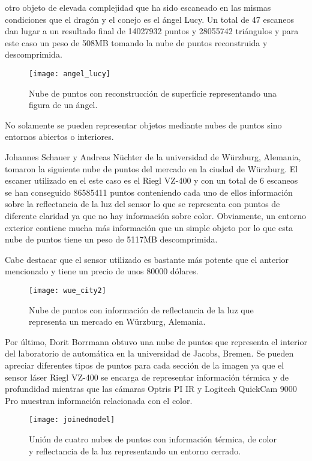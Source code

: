 otro objeto de elevada complejidad que ha sido escaneado en las mismas condiciones que el dragón y el conejo es el ángel Lucy. Un total de 47 escaneos dan lugar a un resultado final de 14027932 puntos y 28055742 triángulos y para este caso un peso de 508MB tomando la nube de puntos reconstruida y descomprimida.

\begin{figure}
\centering
\texttt{[image: angel\_lucy]}
\caption{Nube de puntos con reconstrucción de superficie representando una figura de un ángel.}\label{fig:angel_lucy}
\end{figure}

No solamente se pueden representar objetos mediante nubes de puntos sino entornos abiertos o interiores.

Johannes Schauer y Andreas Nüchter de la universidad de Würzburg, Alemania, tomaron la siguiente nube de puntos del mercado en la ciudad de Würzburg.
El escaner utilizado en el este caso es el Riegl VZ-400 y con un total de 6 escaneos se han conseguido 86585411 puntos conteniendo cada uno de ellos información sobre la reflectancia de la luz del sensor lo que se representa con puntos de diferente claridad ya que no hay información sobre color. Obviamente, un entorno exterior contiene mucha más información que un simple objeto por lo que esta nube de puntos tiene un peso de 5117MB descomprimida.

Cabe destacar que el sensor utilizado es bastante más potente que el anterior mencionado y tiene un precio de unos 80000 dólares.

\begin{figure}
\centering
\texttt{[image: wue\_city2]}
\caption{Nube de puntos con información de reflectancia de la luz que representa un mercado en Würzburg, Alemania.}\label{fig:wue_city}
\end{figure}

Por último, Dorit Borrmann obtuvo una nube de puntos que representa el interior del laboratorio de automática en la universidad de Jacobs, Bremen. Se pueden apreciar diferentes tipos de puntos para cada sección de la imagen ya que el sensor láser Riegl VZ-400 se encarga de representar información térmica y de profundidad mientras que las cámaras Optris PI IR y Logitech QuickCam 9000 Pro muestran información relacionada con el color.

\begin{figure}
\centering
\texttt{[image: joinedmodel]}
\caption{Unión de cuatro nubes de puntos con información térmica, de color y reflectancia de la luz representando un entorno cerrado.}\label{fig:joined_model}
\end{figure}

